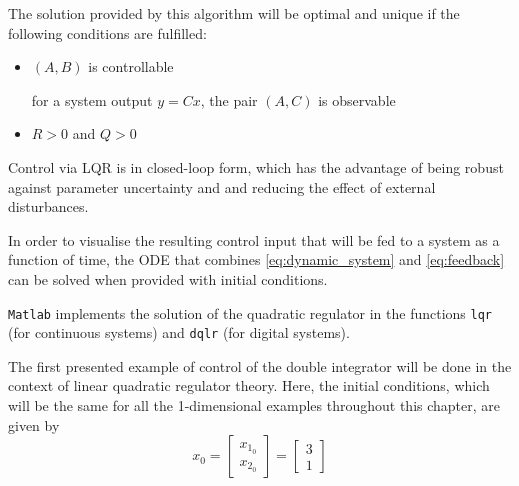 
\par The solution provided by this algorithm will be optimal and unique if the following conditions are fulfilled:
\begin{itemize}
    \item $(A,B)$ is controllable
    \par for a system output $y = C x$, the pair $(A,C)$ is observable
    \item $R>0$ and $Q>0$
\end{itemize}


\par Control via LQR is in closed-loop form, which has the advantage of being robust against parameter uncertainty and and reducing the effect of external disturbances. 
\par In order to visualise the resulting control input that will be fed to a system as a function of time, the ODE that combines \ref{eq:dynamic_system}  and \ref{eq:feedback} can be solved when provided with initial conditions.



\par \texttt{Matlab} implements the solution of the quadratic regulator in the functions \texttt{lqr} (for continuous systems) and \texttt{dqlr} (for digital systems). %


\par The first presented example of control of the double integrator will be done in the context of linear quadratic regulator theory. Here, the initial conditions, which will be the same for all the 1-dimensional examples throughout this chapter, are  given by
\begin{equation}
    \label{eq:initial_conds}
    x_0 = \begin{bmatrix} x_{1_0} \\ x_{2_0} \end{bmatrix} = \begin{bmatrix} 3 \\ 1 \end{bmatrix}
\end{equation}

